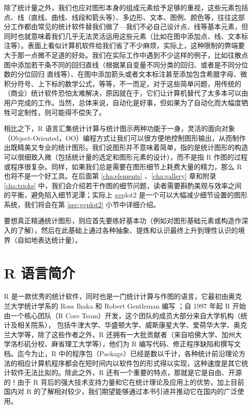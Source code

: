 \documentclass[
  b5paper,
  UTF8,twoside]{book}
\begin{document}
除了统计量之外，我们也应对图形本身的组成元素给予足够的重视，这些元素包括点、线（直线、曲线、线段和箭头等）、多边形、文本、图例、颜色等，往往这部分工作都由常见的统计软件替我们做了---我们不必自己设计点、线等基本元素，但同时也就意味着我们几乎无法灵活运用这些元素（比如在图中添加点、线、文本标注等）。表面上看似计算机软件给我们省了不少麻烦，实际上，这种限制的弊端要大于那一点微不足道的好处。我们在实际工作中遇到不少这样的例子，比如往散点图中添加若干条不同的回归直线（根据某自变量不同分类的回归、或者是不同分位数的分位回归 \citep{quantreg} 直线等）、在图中添加箭头或者文本标注甚至添加包含希腊字母、微积分符号、上下标的数学公式，等等，不一而足，对于这些简单问题，用传统的（商业）统计软件恐怕太难解决，原因就在于，它们让计算机替代了太多本可以由用户完成的工作。当然，总体来说，自动化是好事，但如果为了自动化而大幅度牺牲可定制性，则可能得不偿失了。

相比之下，R 语言汇集统计计算与统计图示两种功能于一身，灵活的面向对象（Object-Oriented，OO）编程方式让我们可以很方便地控制图形输出，从而制作出既精美又专业的统计图形。我们说图形并不意味着简单，指的是统计图形的构造可以很细致入微（包括统计量的选定和图形元素的设计），而不是指 R 作图的过程或程序很复杂。同样，如果我们总是需要在图形细节上耗费大量的精力，那么 R 也将不是一个好工具。在后面第 \ref{cha:elements} 、\ref{cha:gallery} 章和附录 \ref{cha:tricks} 中，我们会介绍若干作图的细节问题，读者需要斟酌美观与效率之间的平衡，避免陷入细节泥潭；实际上 ggplot2 是一个可以大幅减少细节设置的图形系统，我们将会在第 \ref{sec:ggplot2} 小节中详细介绍。

要想真正精通统计图形，则应首先要练好基本功（例如对图形基础元素或构造作深入的了解），然后在此基础上通过各种抽象、提炼和认识最终上升到理性认识的境界（自如地表达统计量）。

\hypertarget{sec:R-intro}{%
\section{R 语言简介}\label{sec:R-intro}}

R\citep{base} 是一款优秀的统计软件，同时也是一门统计计算与作图的语言，它最初由奥克兰大学统计学系的 Ross Ihaka 和 Robert Gentleman 编写 \citep{Ihaka96}；自 1997 年起 R 开始由一个核心团队（R Core Team）开发，这个团队的成员大部分来自大学机构（统计及相关院系），
包括牛津大学、华盛顿大学、威斯康星大学、爱荷华大学、奥克兰大学等，除了这些作者之外，R 还拥有一大批贡献者（来自哈佛大学、加州大学洛杉矶分校、麻省理工大学等），他们为 R 编写代码、修正程序缺陷和撰写文档。迄今为止，R 中的程序包（Package）已经是数以千计，各种统计前沿理论方法的相应计算机程序都会在短时间内以软件包的形式得以实现，这种速度是其它统计软件无法比拟的。除此之外，R 还有一个重要的特点，那就是它是自由、开源的！由于 R 背后的强大技术支持力量和它在统计理论及应用上的优势，加上目前国内对 R 的了解相对较少，我们期望能够通过本书引进并推动它在国内的广泛使用。
\end{document}
